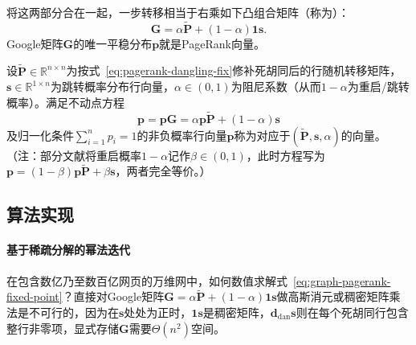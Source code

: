 将这两部分合在一起，一步转移相当于右乘如下凸组合矩阵（称为）：
\begin{equation}
  \bm G = \alpha\widetilde{\bm P} + (1-\alpha)\bm 1\bm s.
  \label{eq:pagerank-google-matrix}
\end{equation}
Google矩阵$\bm G$的唯一平稳分布$\bm p$就是PageRank向量。

\begin{definition}[PageRank向量]
\label{def:graph-pagerank}
设$\widetilde{\bm P}\in\mathbb R^{n\times n}$为按式~\eqref{eq:pagerank-dangling-fix}修补死胡同后的行随机转移矩阵，$\bm s\in\mathbb R^{1\times n}$为跳转概率分布行向量，$\alpha\in(0,1)$为阻尼系数（从而$1-\alpha$为重启/跳转概率）。满足不动点方程
\begin{equation}
\bm{p}=\bm p\bm G=\alpha\bm{p}\widetilde{\bm{P}}+(1-\alpha)\bm{s}
\label{eq:graph-pagerank-fixed-point}
\end{equation}
及归一化条件$\sum_{i=1}^n p_i=1$的非负概率行向量$\bm p$称为对应于$(\widetilde{\bm P},\bm s,\alpha)$的向量。（注：部分文献将重启概率$1-\alpha$记作$\beta\in(0,1)$，此时方程写为$\bm p=(1-\beta)\bm p\widetilde{\bm P}+\beta\bm s$，两者完全等价。）
\end{definition}

\subsection{算法实现}
\label{sec:graph-pagerank-implementation}

\paragraph{基于稀疏分解的幂法迭代}

在包含数亿乃至数百亿网页的万维网中，如何数值求解式~\eqref{eq:graph-pagerank-fixed-point}？直接对Google矩阵$\bm G=\alpha\widetilde{\bm P}+(1-\alpha)\bm 1\bm s$做高斯消元或稠密矩阵乘法是不可行的，因为在$\bm s$处处为正时，$\bm1\bm s$是稠密矩阵，$\bm d_{\mathrm{dan}}\bm s$则在每个死胡同行包含整行非零项，显式存储$\bm G$需要$\Theta(n^2)$空间。

